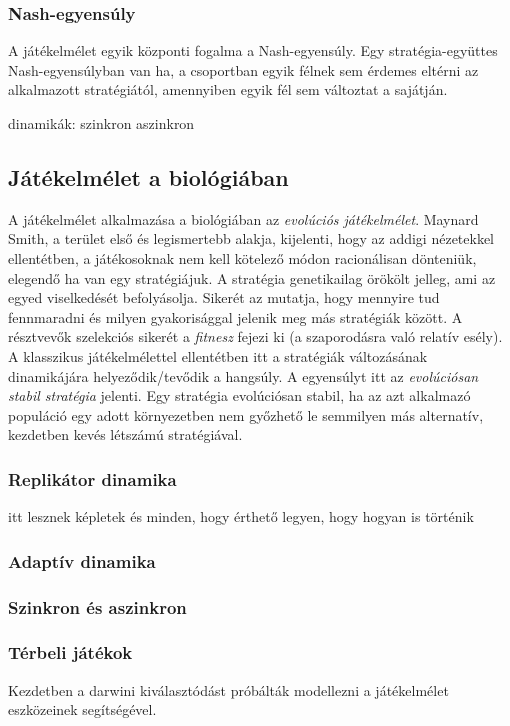 \subsubsection{Nash-egyensúly}
A játékelmélet egyik központi fogalma a Nash-egyensúly. Egy stratégia-együttes Nash-egyensúlyban van ha, a csoportban egyik félnek sem érdemes eltérni az alkalmazott stratégiától, amennyiben egyik fél sem változtat a sajátján. 

dinamikák: szinkron aszinkron

\subsection{Játékelmélet a biológiában}
A játékelmélet alkalmazása a biológiában az \textit{evolúciós játékelmélet}. Maynard Smith, a terület első és legismertebb alakja, kijelenti, hogy az addigi nézetekkel ellentétben, a játékosoknak nem kell kötelező módon racionálisan dönteniük, elegendő ha van egy stratégiájuk. A stratégia genetikailag örökölt jelleg, ami az egyed viselkedését befolyásolja. Sikerét az mutatja, hogy mennyire tud fennmaradni és milyen gyakorisággal jelenik meg más stratégiák között. A résztvevők szelekciós sikerét a \textit{fitnesz} fejezi ki (a szaporodásra való relatív esély). A klasszikus játékelmélettel ellentétben itt a stratégiák változásának dinamikájára helyeződik/tevődik a hangsúly. A egyensúlyt itt az \textit{evolúciósan stabil stratégia} jelenti. Egy stratégia evolúciósan stabil, ha az azt alkalmazó populáció egy adott környezetben nem győzhető le semmilyen más alternatív, kezdetben kevés létszámú stratégiával.

\subsubsection{Replikátor dinamika}
itt lesznek képletek és minden, hogy érthető legyen, hogy hogyan is történik
\subsubsection{Adaptív dinamika}
\subsubsection{Szinkron és aszinkron}
\subsubsection{Térbeli játékok}
\iffalse
Kezdetben a darwini kiválasztódást próbálták modellezni a játékelmélet eszközeinek segítségével. 


